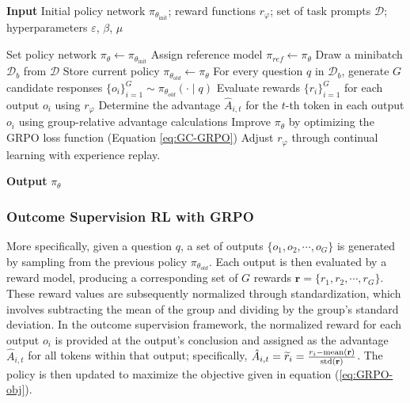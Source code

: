 \begin{itemize}[topsep=0pt]
\begin{algorithm}[t]
  \small
  \caption{Iterative Group Relative Policy Optimization}
  \textbf{Input} Initial policy network $\pi_{\theta_{\text{init}}}$; reward functions $r_\varphi$; set of task prompts $\mathcal{D}$; 
  hyperparameters $\varepsilon$, $\beta$, $\mu$
  \begin{algorithmic}[1]
    \State Set policy network $\pi_\theta \gets \pi_{\theta_{\text{init}}}$
      \State Assign reference model $\pi_{ref} \gets \pi_{\theta}$
        \State Draw a minibatch $\mathcal{D}_b$ from $\mathcal{D}$
        \State Store current policy $\pi_{\theta_{old}} \gets \pi_{\theta}$ 
        \State For every question $q$ in $\mathcal{D}_b$, generate $G$ candidate responses $\{o_i\}_{i=1}^G \sim \pi_{\theta_{old}} (\cdot \mid q)$ 
        \State Evaluate rewards $\{r_i\}_{i=1}^G$ for each output $o_i$ using $r_{\varphi}$ 
        \State Determine the advantage $\hat{A}_{i,t}$ for the $t$-th token in each output $o_i$ using group-relative advantage calculations
          \State Improve $\pi_{\theta}$ by optimizing the GRPO loss function (Equation \ref{eq:GC-GRPO})
        \EndFor
      \EndFor 
      \State Adjust $r_\varphi$ through continual learning with experience replay. 
    \EndFor 
  \end{algorithmic}
  \textbf{Output} $\pi_\theta$
  \label{alg:iter-grpo}
\end{algorithm}

\subsubsection{Outcome Supervision RL with GRPO} More specifically, given a question $q$, a set of outputs $\{o_1, o_2, \cdots, o_G\}$ is generated by sampling from the previous policy $\pi_{\theta_{old}}$. Each output is then evaluated by a reward model, producing a corresponding set of $G$ rewards $\mathbf{r}=\{r_1, r_2, \cdots, r_G\}$. These reward values are subsequently normalized through standardization, which involves subtracting the mean of the group and dividing by the group's standard deviation. In the outcome supervision framework, the normalized reward for each output $o_i$ is provided at the output's conclusion and assigned as the advantage $\hat{A}_{i, t}$ for all tokens within that output; specifically, $\hat{A}_{i, t} = \widetilde{r}_i = \frac{r_i- {\rm mean}(\mathbf{r})}{{\rm std}(\mathbf{r})}$. The policy is then updated to maximize the objective given in equation (\ref{eq:GRPO-obj}).


\end{itemize}

